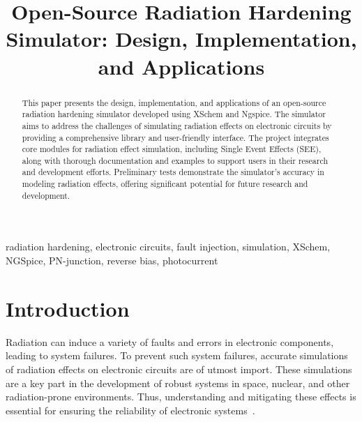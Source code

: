 \documentclass[conference]{IEEEtran}
\begin{document}
    \title{Open-Source Radiation Hardening Simulator: Design, Implementation, and Applications}

    \author{
    }

    \maketitle

    \begin{abstract}
        This paper presents the design, implementation, and applications of an open-source radiation hardening simulator developed using XSchem and Ngspice.
        The simulator aims to address the challenges of simulating radiation effects on electronic circuits by providing a comprehensive library and user-friendly interface.
        The project integrates core modules for radiation effect simulation, including Single Event Effects (SEE), along with thorough documentation and examples to support users in their research and development efforts.
        Preliminary tests demonstrate the simulator's accuracy in modeling radiation effects, offering significant potential for future research and development.
    \end{abstract}

    \begin{IEEEkeywords}
        radiation hardening, electronic circuits, fault injection, simulation, XSchem, NGSpice, PN-junction, reverse bias, photocurrent
    \end{IEEEkeywords}


    \section{Introduction}\label{sec:introduction}
    Radiation can induce a variety of faults and errors in electronic components, leading to system failures.
    To prevent such system failures, accurate simulations of radiation effects on electronic circuits are of utmost import. These simulations are a key part in the development of robust systems in space, nuclear, and other radiation-prone environments.
    Thus, understanding and mitigating these effects is essential for ensuring the reliability of electronic systems~\cite{Wrobel2011, Florian1986}.
\end{document}
